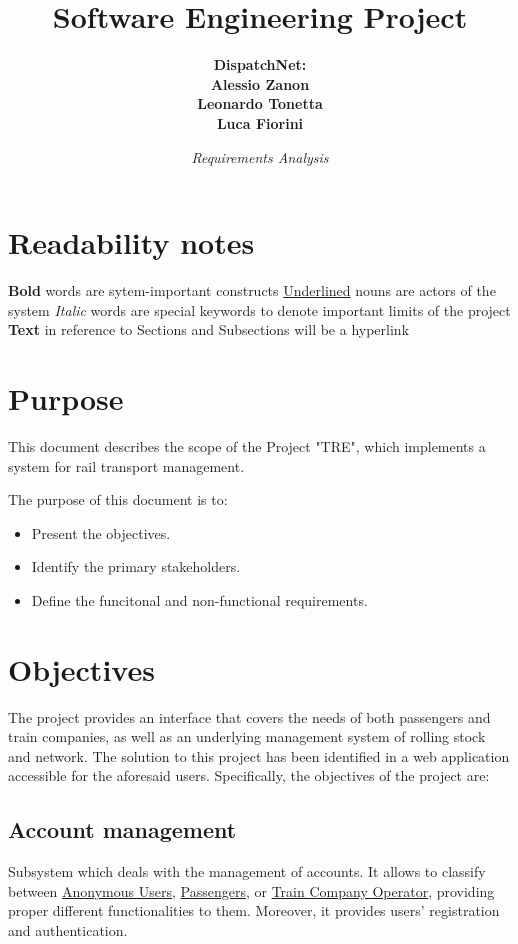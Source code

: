 \documentclass[12pt]{article}
\title{\bf{Software Engineering Project}}
\author{\bf{DispatchNet:} \\ Alessio Zanon \\ Leonardo Tonetta \\ Luca Fiorini}
\date{\it{Requirements Analysis}}
\renewcommand\bf[1]{\textbf{#1}}
\renewcommand\it[1]{\textit{#1}}
\newcommand\un[1]{\underline{#1}}
\begin{document}
\maketitle

\newpage
\tableofcontents

\section*{Readability notes}
\bf{Bold} words are sytem-important constructs \newline
\un{Underlined} nouns are actors of the system \newline
\it{Italic} words are special keywords to denote important limits of the project
\bf{Text} in reference to Sections and Subsections will be a hyperlink
\newpage


\section*{Purpose}
This document describes the scope of the Project "TRE", which implements a system for rail transport management.

The purpose of this document is to: 
\begin{itemize}
	\item Present the objectives.
	\item Identify the primary stakeholders.
	\item Define the funcitonal and non-functional requirements.
\end{itemize}

\section{Objectives}
The project provides an interface that covers the needs of both passengers and train companies, as well as an underlying management system of rolling stock and network. The solution to this project has been identified in a web application accessible for the aforesaid users.
Specifically, the objectives of the project are:

\subsection{Account management} \label{O.1}
Subsystem which deals with the management of accounts. It allows to classify between \un{Anonymous Users}, \un {Passengers}, or \un{Train Company Operator}, providing proper different functionalities to them. Moreover, it provides users' registration and authentication.
\end{document}

